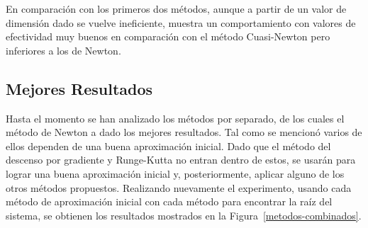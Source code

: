 \par En comparaci\'on con los primeros dos m\'etodos, aunque a partir de un valor de dimensi\'on dado se vuelve ineficiente, muestra un comportamiento con valores de efectividad muy buenos en comparaci\'on con el m\'etodo Cuasi-Newton pero inferiores a los de Newton.

\subsection{Mejores Resultados}

\par Hasta el momento se han analizado los m\'etodos por separado, de los cuales el m\'etodo de Newton a dado los mejores resultados. Tal como se mencion\'o varios de ellos dependen de una buena aproximaci\'on inicial. Dado que el m\'etodo del descenso por gradiente y Runge-Kutta no entran dentro de estos, se usar\'an para lograr una buena aproximaci\'on inicial y, posteriormente, aplicar alguno de los otros m\'etodos propuestos. Realizando nuevamente el experimento, usando cada m\'etodo de aproximaci\'on inicial con cada m\'etodo para encontrar la ra\'iz del sistema, se obtienen los resultados mostrados en la Figura~\ref{metodos-combinados}.\\

